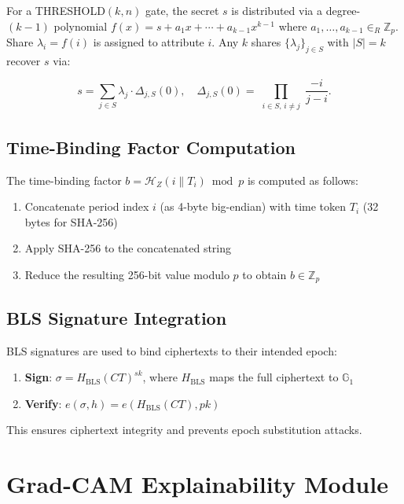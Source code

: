 \documentclass[lettersize,journal]{IEEEtran}
\begin{document}
For a THRESHOLD$(k,n)$ gate, the secret $s$ is distributed via a degree-$(k-1)$ polynomial $f(x) = s + a_1 x + \cdots + a_{k-1} x^{k-1}$ where $a_1, \ldots, a_{k-1} \in_R \mathbb{Z}_p$. Share $\lambda_i = f(i)$ is assigned to attribute $i$. Any $k$ shares $\{\lambda_j\}_{j \in S}$ with $|S| = k$ recover $s$ via:

\begin{equation}
s = \sum_{j \in S} \lambda_j \cdot \Delta_{j,S}(0), \quad
\Delta_{j,S}(0) = \prod_{\substack{i \in S, \, i \neq j}} \frac{-i}{j - i}.
\end{equation}

\subsection{Time-Binding Factor Computation}

The time-binding factor $b = \mathcal{H}_Z(i \| T_i) \bmod p$ is computed as follows:

\begin{enumerate}
    \item Concatenate period index $i$ (as 4-byte big-endian) with time token $T_i$ (32 bytes for SHA-256)
    \item Apply SHA-256 to the concatenated string
    \item Reduce the resulting 256-bit value modulo $p$ to obtain $b \in \mathbb{Z}_p$
\end{enumerate}

\subsection{BLS Signature Integration}

BLS signatures are used to bind ciphertexts to their intended epoch:

\begin{enumerate}
    \item \textbf{Sign}: $\sigma = H_{\text{BLS}}(CT)^{sk}$, where $H_{\text{BLS}}$ maps the full ciphertext to $\mathbb{G}_1$
    \item \textbf{Verify}: $e(\sigma, h) = e(H_{\text{BLS}}(CT), pk)$
\end{enumerate}

This ensures ciphertext integrity and prevents epoch substitution attacks.

\section{Grad-CAM Explainability Module}
\label{sec:gradcam_supp}
\end{document}
